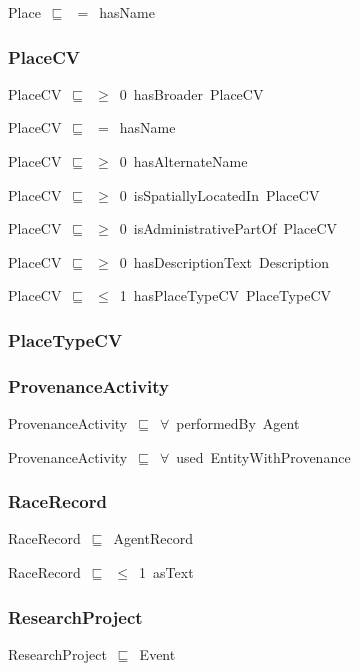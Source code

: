 \documentclass{article}
\begin{document}
Place~\ensuremath{\sqsubseteq}~\ensuremath{=}~hasName~

\subsubsection*{PlaceCV}

PlaceCV~\ensuremath{\sqsubseteq}~\ensuremath{\geq}~0~hasBroader~PlaceCV~

PlaceCV~\ensuremath{\sqsubseteq}~\ensuremath{=}~hasName~

PlaceCV~\ensuremath{\sqsubseteq}~\ensuremath{\geq}~0~hasAlternateName~

PlaceCV~\ensuremath{\sqsubseteq}~\ensuremath{\geq}~0~isSpatiallyLocatedIn~PlaceCV~

PlaceCV~\ensuremath{\sqsubseteq}~\ensuremath{\geq}~0~isAdministrativePartOf~PlaceCV~

PlaceCV~\ensuremath{\sqsubseteq}~\ensuremath{\geq}~0~hasDescriptionText~Description~

PlaceCV~\ensuremath{\sqsubseteq}~\ensuremath{\leq}~1~hasPlaceTypeCV~PlaceTypeCV~

\subsubsection*{PlaceTypeCV}

\subsubsection*{ProvenanceActivity}

ProvenanceActivity~\ensuremath{\sqsubseteq}~\ensuremath{\forall}~performedBy~Agent~

ProvenanceActivity~\ensuremath{\sqsubseteq}~\ensuremath{\forall}~used~EntityWithProvenance~

\subsubsection*{RaceRecord}

RaceRecord~\ensuremath{\sqsubseteq}~AgentRecord~

RaceRecord~\ensuremath{\sqsubseteq}~\ensuremath{\leq}~1~asText~

\subsubsection*{ResearchProject}

ResearchProject~\ensuremath{\sqsubseteq}~Event~
\end{document}
